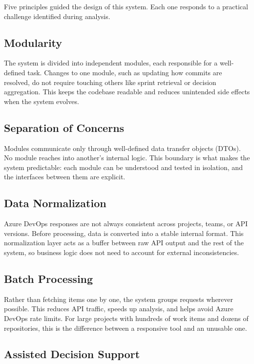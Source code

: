 Five principles guided the design of this system. Each one responds to a practical challenge identified during analysis.

\subsection{Modularity}

The system is divided into independent modules, each responsible for a well-defined task. Changes to one module, such as updating how commits are resolved, do not require touching others like sprint retrieval or decision aggregation. This keeps the codebase readable and reduces unintended side effects when the system evolves.

\subsection{Separation of Concerns}

Modules communicate only through well-defined data transfer objects (DTOs). No module reaches into another's internal logic. This boundary is what makes the system predictable: each module can be understood and tested in isolation, and the interfaces between them are explicit.

\subsection{Data Normalization}

Azure DevOps responses are not always consistent across projects, teams, or API versions. Before processing, data is converted into a stable internal format. This normalization layer acts as a buffer between raw API output and the rest of the system, so business logic does not need to account for external inconsistencies.

\subsection{Batch Processing}

Rather than fetching items one by one, the system groups requests wherever possible. This reduces API traffic, speeds up analysis, and helps avoid Azure DevOps rate limits. For large projects with hundreds of work items and dozens of repositories, this is the difference between a responsive tool and an unusable one.

\subsection{Assisted Decision Support}

